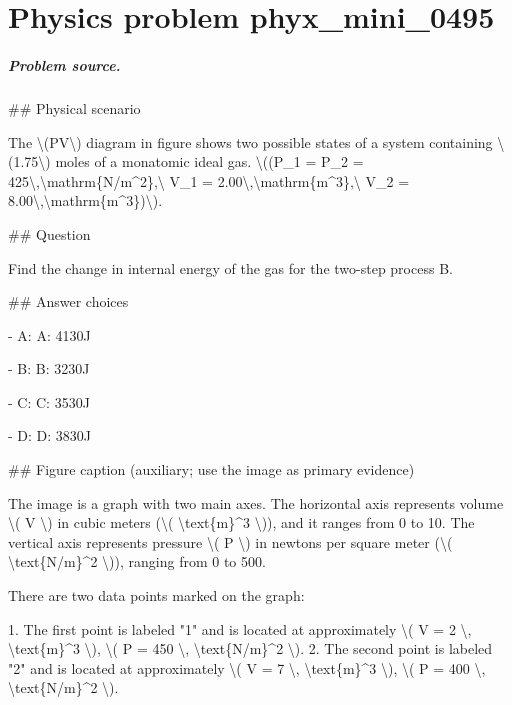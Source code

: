 
\chapter{Physics problem phyx\_mini\_0495}
\label{ch:PhyXMiniProblems_problem_phyx_mini_0495}

\paragraph{Problem source.}
\#\# Physical scenario

The \textbackslash{}(PV\textbackslash{}) diagram in figure shows two possible states of a system containing \textbackslash{}(1.75\textbackslash{}) moles of a monatomic ideal gas. \textbackslash{}((P\_1 = P\_2 = 425\textbackslash{},\textbackslash{}mathrm\{N/m\textasciicircum{}2\},\textbackslash{} V\_1 = 2.00\textbackslash{},\textbackslash{}mathrm\{m\textasciicircum{}3\},\textbackslash{} V\_2 = 8.00\textbackslash{},\textbackslash{}mathrm\{m\textasciicircum{}3\})\textbackslash{}).

\#\# Question

Find the change in internal energy of the gas for the two-step process B.

\#\# Answer choices

- A: A: 4130J

- B: B: 3230J

- C: C: 3530J

- D: D: 3830J

\#\# Figure caption (auxiliary; use the image as primary evidence)

The image is a graph with two main axes. The horizontal axis represents volume \textbackslash{}( V \textbackslash{}) in cubic meters (\textbackslash{}( \textbackslash{}text\{m\}\textasciicircum{}3 \textbackslash{})), and it ranges from 0 to 10. The vertical axis represents pressure \textbackslash{}( P \textbackslash{}) in newtons per square meter (\textbackslash{}( \textbackslash{}text\{N/m\}\textasciicircum{}2 \textbackslash{})), ranging from 0 to 500.

There are two data points marked on the graph:

1. The first point is labeled "1" and is located at approximately \textbackslash{}( V = 2 \textbackslash{}, \textbackslash{}text\{m\}\textasciicircum{}3 \textbackslash{}), \textbackslash{}( P = 450 \textbackslash{}, \textbackslash{}text\{N/m\}\textasciicircum{}2 \textbackslash{}).
2. The second point is labeled "2" and is located at approximately \textbackslash{}( V = 7 \textbackslash{}, \textbackslash{}text\{m\}\textasciicircum{}3 \textbackslash{}), \textbackslash{}( P = 400 \textbackslash{}, \textbackslash{}text\{N/m\}\textasciicircum{}2 \textbackslash{}).

